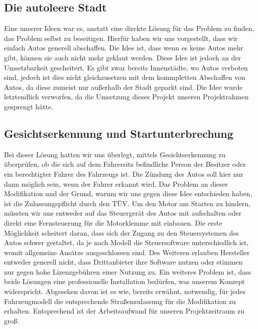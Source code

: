\subsection{Die autoleere Stadt}
Eine unserer Ideen war es, anstatt eine direkte Lösung für das Problem zu finden, das Problem selbst zu beseitigen. Hierfür haben wir uns vorgestellt, dass wir einfach Autos generell abschaffen. Die Idee ist, dass wenn es keine Autos mehr gibt, können sie auch nicht mehr geklaut werden. Diese Idee ist jedoch an der Umsetzbarkeit gescheitert. Es gibt zwar bereits Innenstädte, wo Autos verboten sind, jedoch ist dies nicht gleichzusetzen mit dem kommpletten Abschaffen von Autos, da diese zumeist nur außerhalb der Stadt geparkt sind. Die Idee wurde letztendlich verworfen, da die Umsetzung dieses Projekt unseren Projektrahmen gesprengt hätte. 
\subsection{Gesichtserkennung und Startunterbrechung}
Bei dieser Lösung hatten wir uns überlegt, mittels Gesichtserkennung zu überprüfen, ob die sich auf dem Fahrersitz befindliche Person der Besitzer oder ein berechtigter Fahrer des Fahrzeugs ist. Die Zündung des Autos soll hier nur dann möglich sein, wenn der Fahrer erkannt wird. Das Problem an dieser Modifikation und der Grund, warum wir uns gegen diese Idee entschieden haben, ist die Zulassungspflicht durch den TÜV. Um den Motor am Starten zu hindern, müssten wir uns entweder auf das Steuergerät des Autos mit aufschalten oder direkt eine Fernsteuerung für die Motorklemme mit einbauen. Die erste Möglichkeit scheitert daran, dass sich der Zugang zu den Steuersystemen des Autos schwer gestaltet, da je nach Modell die Steuersoftware unterschiedlich ist, womit allgemeine Ansätze ausgeschlossen sind. Des Weiteren erlauben Hersteller entweder generell nicht, dass Drittanbieter ihre Software nutzen oder stimmen nur gegen hohe Lizenzgebühren einer Nutzung zu. Ein weiteres Problem ist, dass beide Lösungen eine professionelle Installation bedürfen, was unserem Konzept widerspricht. Abgesehen davon ist es wie, bereits erwähnt, notwendig, für jedes Fahrzeugmodell die entsprechende Straßenzulassung für die Modifikation zu erhalten. Entsprechend ist der Arbeitsaufwand für unseren Projektzeitraum zu groß. 